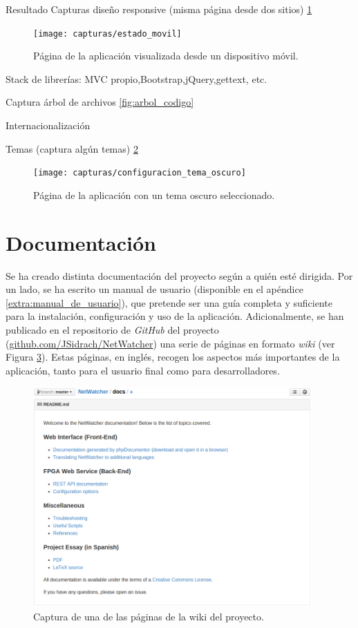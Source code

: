 Resultado Capturas diseño responsive (misma página desde dos sitios) \ref{fig:captura:movil}
\begin{figure}[!htp]
  \centering
  \texttt{[image: capturas/estado\_movil]}
  \caption{Página de la aplicación visualizada desde un dispositivo móvil.}
  \label{fig:captura:movil}
\end{figure}

Stack de librerías: MVC propio,Bootstrap,jQuery,gettext, etc.

Captura árbol de archivos \ref{fig:arbol_codigo}

Internacionalización

Temas (captura algún temas) \ref{fig:captura:oscuro}
\begin{figure}[!htp]
  \centering
  \texttt{[image: capturas/configuracion\_tema\_oscuro]}
  \caption{Página de la aplicación con un tema oscuro seleccionado.}
  \label{fig:captura:oscuro}
\end{figure}


\section{Documentación \label{sec:imp:docs}}

Se ha creado distinta documentación del proyecto según a quién esté dirigida.
Por un lado, se ha escrito un manual de usuario (disponible en el apéndice \ref{extra:manual_de_usuario}), que pretende ser una guía completa y suficiente para la instalación, configuración y uso de la aplicación.
Adicionalmente, se han publicado en el repositorio de \textit{GitHub} del proyecto (\url{github.com/JSidrach/NetWatcher}) una serie de páginas en formato \textit{wiki} (ver Figura \ref{fig:captura:wiki}). Estas páginas, en inglés, recogen los aspectos más importantes de la aplicación, tanto para el usuario final como para desarrolladores.

\begin{figure}[!htp]
  \centering
  \includegraphics[width=0.95\textwidth,clip=true]{graphics/capturas/github_docs}
  \caption{Captura de una de las páginas de la wiki del proyecto.}
  \label{fig:captura:wiki}
\end{figure} 


